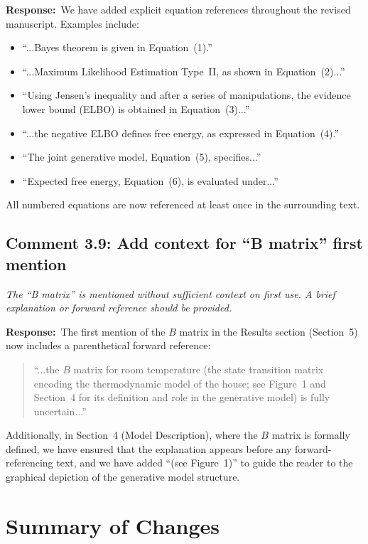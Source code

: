 \documentclass[11pt]{article}
\newcommand{\reviewercomment}[1]{\textit{#1}}
\newcommand{\response}{\textbf{Response:}\ }
\begin{document}
\response We have added explicit equation references throughout the revised manuscript. Examples include:

\begin{itemize}
    \item ``...Bayes theorem is given in Equation~(1).''
    \item ``...Maximum Likelihood Estimation Type~II, as shown in Equation~(2)...''
    \item ``Using Jensen's inequality and after a series of manipulations, the evidence lower bound (ELBO) is obtained in Equation~(3)...''
    \item ``...the negative ELBO defines free energy, as expressed in Equation~(4).''
    \item ``The joint generative model, Equation~(5), specifies...''
    \item ``Expected free energy, Equation~(6), is evaluated under...''
\end{itemize}

All numbered equations are now referenced at least once in the surrounding text.

\subsection*{Comment 3.9: Add context for ``B matrix'' first mention}

\reviewercomment{The ``B matrix'' is mentioned without sufficient context on first use. A brief explanation or forward reference should be provided.}

\response The first mention of the $B$ matrix in the Results section (Section~5) now includes a parenthetical forward reference:

\begin{quote}
``...the $B$ matrix for room temperature (the state transition matrix encoding the thermodynamic model of the house; see Figure~1 and Section~4 for its definition and role in the generative model) is fully uncertain...''
\end{quote}

Additionally, in Section~4 (Model Description), where the $B$ matrix is formally defined, we have ensured that the explanation appears before any forward-referencing text, and we have added ``(see Figure~1)'' to guide the reader to the graphical depiction of the generative model structure.

\section*{Summary of Changes}
\end{document}
